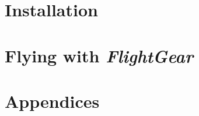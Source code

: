 \documentclass[11pt,openany]{book}
\newcommand{\FlightGear}{{\itshape\bfseries FlightGear}}
\begin{document}


\part{Installation}



\part{Flying with \FlightGear{}}


\part{Appendices}
\begin{appendix}



\end{appendix}


\end{document}
